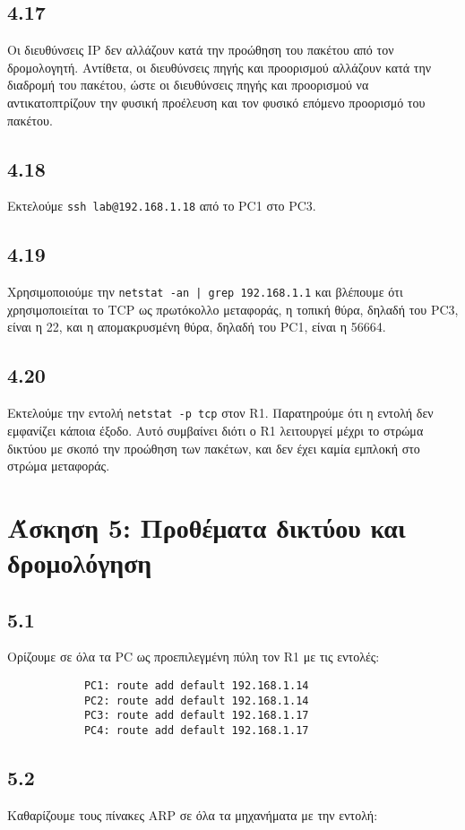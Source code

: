 \documentclass[a4paper, 12pt]{article}
\begin{document}
	\subsection*{4.17}
		Οι διευθύνσεις IP δεν αλλάζουν κατά την προώθηση του πακέτου από τον δρομολογητή. Αντίθετα, οι διευθύνσεις πηγής και προορισμού αλλάζουν κατά την διαδρομή του πακέτου, ώστε οι διευθύνσεις πηγής και προορισμού να αντικατοπτρίζουν την φυσική προέλευση και τον φυσικό επόμενο προορισμό του πακέτου.

	\subsection*{4.18}
		Εκτελούμε \verb|ssh lab@192.168.1.18| από το PC1 στο PC3.

	\subsection*{4.19}
		Χρησιμοποιούμε την \verb+netstat -an | grep 192.168.1.1+ και βλέπουμε ότι χρησιμοποιείται το TCP ως πρωτόκολλο μεταφοράς, η τοπική θύρα, δηλαδή του PC3, είναι η 22, και η απομακρυσμένη θύρα, δηλαδή του PC1, είναι η 56664.

	\subsection*{4.20}
		Εκτελούμε την εντολή \verb|netstat -p tcp| στον R1. Παρατηρούμε ότι η εντολή δεν εμφανίζει κάποια έξοδο. Αυτό συμβαίνει διότι ο R1 λειτουργεί μέχρι το στρώμα δικτύου με σκοπό την προώθηση των πακέτων, και δεν έχει καμία εμπλοκή στο στρώμα μεταφοράς. 
		

\section*{Άσκηση 5: Προθέματα δικτύου και δρομολόγηση}
	\subsection*{5.1}
		Ορίζουμε σε όλα τα PC ως προεπιλεγμένη πύλη τον R1 με τις εντολές:
		
		\begin{verbatim}
			PC1: route add default 192.168.1.14
			PC2: route add default 192.168.1.14
			PC3: route add default 192.168.1.17
			PC4: route add default 192.168.1.17
		\end{verbatim}

	\subsection*{5.2}
		Καθαρίζουμε τους πίνακες ARP σε όλα τα μηχανήματα με την εντολή:
		
\end{document}
